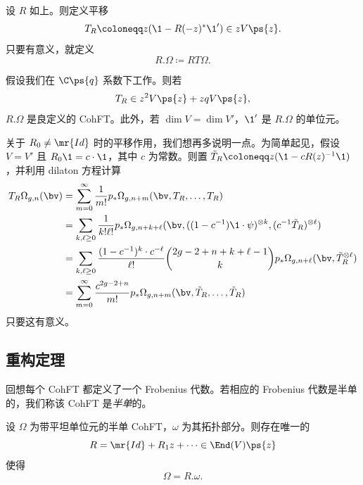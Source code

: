 \begin{defn}
    设 \(R\) 如上。则定义平移
    \[ T_R \coloneqq z (\1 - R(-z)^* \1') \in z V\ps{z}. \]
    只要有意义，就定义
    \[ R.\Omega \coloneqq RT\Omega. \]
\end{defn}

\begin{thm}
    假设我们在 \(\C\ps{q}\) 系数下工作。则若
    \[ T_R \in z^2 V \ps{z} + zq V \ps{z}, \]
    \(R.\Omega\) 是良定义的 CohFT。此外，若 \(\dim V = \dim V'\)，\(\1'\) 是 \(R.\Omega\) 的单位元。
\end{thm}

关于 \(R_0 \neq \mr{Id}\) 时的平移作用，我们想再多说明一点。为简单起见，假设 \(V = V'\) 且 \(R_0 \1 = c \cdot \1\)，其中 \(c\) 为常数。则置 \(\tilde{T}_R \coloneqq z( \1 - c R(z)^{-1} \1)\)，并利用 dilaton 方程计算
\begin{align*}
    T_R \Omega_{g,n}(\bv) &= \sum_{m=0}^{\infty} \frac{1}{m!} p_*\Omega_{g,n+m}(\bv, T_R, \ldots, T_R) \\
    &= \sum_{k,\ell \geq 0} \frac{1}{k!\ell!} p_* \Omega_{g,n+k+\ell}(\bv, ( (1-c^{-1})\1 \cdot \psi )^{\otimes k}, ( c^{-1} \tilde{T}_R )^{\otimes \ell}) \\
    &= \sum_{k,\ell \geq 0} \frac{(1-c^{-1})^k \cdot c^{-\ell}}{\ell!} \binom{2g-2+n+k+\ell-1}{k} p_* \Omega_{g,n+\ell}(\bv, \tilde{T}_R^{\otimes \ell}) \\
    &= \sum_{m=0}^{\infty} \frac{c^{2g-2+n}}{m!} p_* \Omega_{g,n+m}(\bv, \tilde{T}_R, \ldots, \tilde{T}_R)
\end{align*}
只要这有意义。


\subsection{重构定理}%
\label{sub:Reconstruction theorem}

回想每个 CohFT 都定义了一个 Frobenius 代数。若相应的 Frobenius 代数是半单的，我们称该 CohFT 是\textit{半单}的。

\begin{thm}%
\label{thm:teleman}
    设 \(\Omega\) 为带平坦单位元的半单 CohFT，\(\omega\) 为其拓扑部分。则存在唯一的
    \[ R = \mr{Id} + R_1 z + \cdots \in \End(V)\ps{z} \]
    使得
    \[ \Omega = R.\omega. \]
\end{thm}

